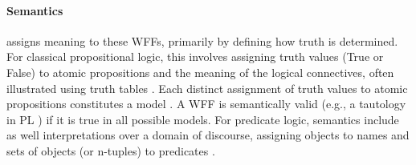 \paragraph{Semantics} assigns meaning to these WFFs, primarily by defining how truth is determined. For classical propositional logic, this involves assigning truth values (True or False) to atomic propositions and the meaning of the logical connectives, often illustrated using truth tables \cite[Sec.~3.1-3.2]{Agler2013SymbolicLogic}. Each distinct assignment of truth values to atomic propositions constitutes a model \cite[Sec.~3.1]{Agler2013SymbolicLogic}. A WFF is semantically valid (e.g., a tautology in PL \cite[Sec.~3.3.1]{Agler2013SymbolicLogic}) if it is true in all possible models. For predicate logic, semantics include as well interpretations over a domain of discourse, assigning objects to names and sets of objects (or n-tuples) to predicates \cite[Ch.~6.4]{Agler2013SymbolicLogic}.

